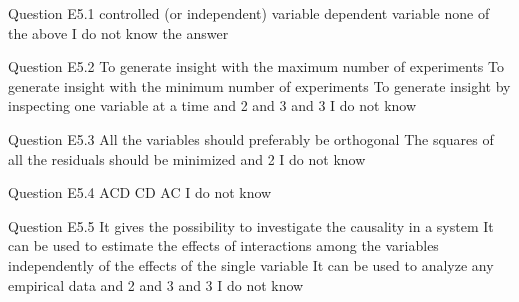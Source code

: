 \begin{frame}{Question E5.1}
	\QuestionNotes{}
	\QuestionAnswers
	{
		\correctanswer controlled (or independent) variable 
		\answer dependent variable
		\answer none of the above
		\answer I do not know the answer
	}
\end{frame}


\begin{frame}{Question E5.2}
	\QuestionNotes{}
	\QuestionAnswers
	{
		\answer To generate insight with the maximum number of experiments 
		\correctanswer To generate insight with the minimum number of experiments 
		\answer To generate insight by inspecting one variable at a time
		 and 2
		 and 3
		 and 3
		\answer I do not know
	}
\end{frame}

\begin{frame}{Question E5.3}
	\QuestionNotes{}
	\QuestionAnswers
	{
		\answer All the variables should preferably be orthogonal 
		\answer The squares of all the residuals should be minimized
		 and 2
		\answer I do not know
	}
\end{frame}


\begin{frame}{Question E5.4}
	\QuestionNotes{}
	\QuestionAnswers
	{
		\correctanswer ACD 
		\answer CD
		\answer AC
		\answer I do not know
	}
\end{frame}


\begin{frame}{Question E5.5}
	\QuestionNotes{}
	\QuestionAnswers
	{
		\answer It gives the possibility to investigate the causality in a system
        \answer It can be used to estimate the effects of interactions among the variables independently of the effects of the single variable
		\answer It can be used to analyze any empirical data
		 and 2
		 and 3
		 and 3
		\answer I do not know
	}
\end{frame}


